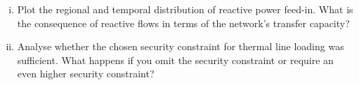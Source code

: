 \documentclass[11pt,a4paper,fleqn]{scrartcl}
\begin{document}
\begin{enumerate}[(a)]
       \begin{enumerate}[(i)]
        \item Plot the regional and temporal distribution of reactive power feed-in. What is the consequence of reactive flows in terms of the network's transfer capacity?
        \item Analyse whether the chosen security constraint for thermal line loading  was sufficient. What happens if you omit the security constraint or require an even higher security constraint?
       \end{enumerate}
\end{enumerate}


\end{document}
